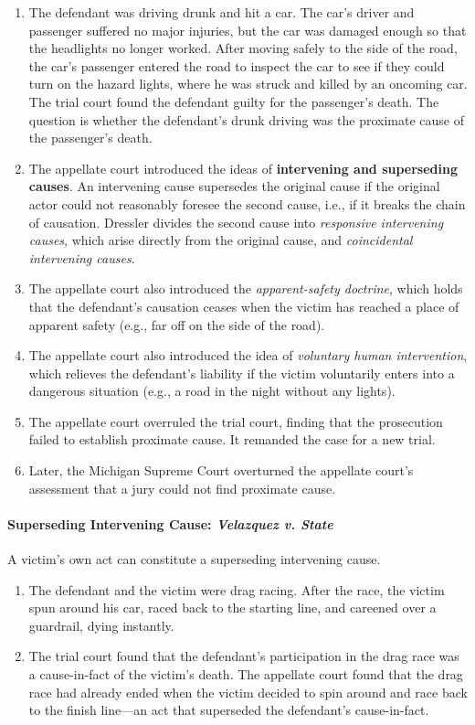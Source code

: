 \begin{enumerate}
    \item The defendant was driving drunk and hit a car. The car's driver and 
    passenger suffered no major injuries, but the car was damaged enough so 
    that the headlights no longer worked. After moving safely to the side of 
    the road, the car's passenger entered the road to inspect the car to see 
    if they could turn on the hazard lights, where he was struck and killed by 
    an oncoming car. The trial court found the defendant guilty for the 
    passenger's death. The question is whether the defendant's drunk driving 
    was the proximate cause of the passenger's death.
    \item The appellate court introduced the ideas of \textbf{intervening and 
    superseding causes}. An intervening cause supersedes the original cause if 
    the original actor could not reasonably foresee the second cause, i.e., if 
    it breaks the chain of causation. Dressler divides the second cause into 
    \emph{responsive intervening causes}, which arise directly from the 
    original cause, and \emph{coincidental intervening causes}.
    \item The appellate court also introduced the \emph{apparent-safety 
    doctrine}, which holds that the defendant's causation ceases when the 
    victim has reached a place of apparent safety (e.g., far off on the side 
    of the road).
    \item The appellate court also introduced the idea of \emph{voluntary 
    human intervention}, which relieves the defendant's liability if the 
    victim voluntarily enters into a dangerous situation (e.g., a road in the 
    night without any lights).
    \item The appellate court overruled the trial court, finding that the 
    prosecution failed to establish proximate cause. It remanded the case for 
    a new trial.
    \item Later, the Michigan Supreme Court overturned the appellate court's 
    assessment that a jury could not find proximate cause.
\end{enumerate}

\paragraph{Superseding Intervening Cause: \emph{Velazquez v. State}}

A victim's own act can constitute a superseding intervening cause.

\begin{enumerate}
    \item The defendant and the victim were drag racing. After the race, the 
    victim spun around his car, raced back to the starting line, and careened 
    over a guardrail, dying instantly.
    \item The trial court found that the defendant's participation in the drag 
    race was a cause-in-fact of the victim's death. The appellate court found 
    that the drag race had already ended when the victim decided to spin 
    around and race back to the finish line---an act that superseded the 
    defendant's cause-in-fact.
\end{enumerate}
